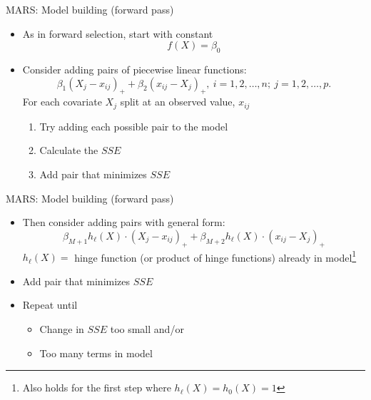 \documentclass[handout]{beamer}
\begin{document}
\begin{frame}{MARS: Model building (forward pass)}
  
  \begin{itemize}[<+->]
    \item As in forward selection, start with constant
    \begin{equation*}
      f(X) = \beta_{0}
    \end{equation*}
    \item Consider adding pairs of piecewise linear functions:
  \begin{equation*}
  \beta_{1} (X_{j} - x_{ij})_{+} + \beta_{2}(x_{ij} - X_{j})_{+}, \ i = 1, 2, \ldots, n; \ j = 1, 2, \ldots, p.
  \end{equation*}
   For each covariate $X_{j}$ split at an observed value, $x_{ij}$
  \begin{enumerate}
    \item Try adding each possible pair to the model
    \item Calculate the $SSE$
    \item Add pair that minimizes $SSE$
  \end{enumerate}
  \end{itemize}

\end{frame}

\begin{frame}{MARS: Model building (forward pass)}
  \begin{itemize}[<+->]
    \item Then consider adding pairs with general form:
  \begin{equation*} \label{eq:gen-pairs-add}
    \beta_{M + 1} h_{\ell}(X) \cdot (X_{j} - x_{ij})_{+} + \beta_{M + 2} h_{\ell}(X) \cdot (x_{ij} - X_{j})_{+}
  \end{equation*}
  $h_{\ell}(X) = $ hinge function (or product of hinge functions) already in model\footnote{Also holds for the first step where $h_{\ell}(X) = h_{0}(X) = 1$}
  \item Add pair that minimizes $SSE$
  \item Repeat until 
  \begin{itemize}
    \item Change in $SSE$ too small and/or
    \item Too many terms in model
  \end{itemize}
  \end{itemize}
\end{frame}
\end{document}
